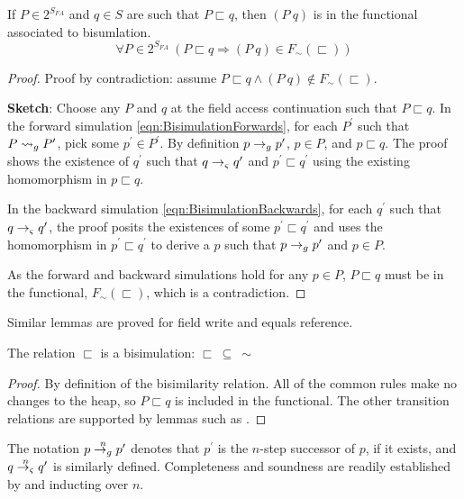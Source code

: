 \begin{lemma}
If $P \in 2^{S_\mathit{FA}}$ and $q \in S$ are such that $P \sqsubset q$, then $(P\ q)$ is in the functional associated to bisumlation.
\label{lem:access}
$$
\forall P \in 2^{S_\mathit{FA}}\ (P \sqsubset q \Rightarrow (P\ q) \in F_\sim(\sqsubset))
$$
\end{lemma}

\begin{proof}
Proof by contradiction: assume $P \sqsubset q \wedge (P\ q) \not\in F_\sim(\sqsubset)$.

\noindent\textbf{Sketch}: Choose any $P$ and $q$ at the field access continuation such
that $P \sqsubset q$. In the forward simulation
\eqref{eqn:BisimulationForwards}, for each $P^\prime$ such that $P
\leadsto_{g} P^\prime$, pick some $p^\prime \in P^\prime$. By definition $p \rightarrow_{g}
p^\prime$, $p \in P$, and $p \sqsubset q$. The proof shows the
existence of $q^\prime$ such that $q \rightarrow_{\varsigma} q^\prime$ and $p^\prime
\sqsubset q^\prime$ using the existing homomorphism in $p \sqsubset q$.

In the backward simulation \eqref{eqn:BisimulationBackwards}, for each
$q^\prime$ such that $q \rightarrow_{\varsigma} q^\prime$, the proof posits the
existences of some $p^\prime \sqsubset q^\prime$ and uses the
homomorphism in $p^\prime \sqsubset q^\prime$ to derive a $p$ such
that $p \rightarrow_{g} p^\prime$ and $p \in P$.

As the forward and backward simulations hold for any $p \in P$, $P
\sqsubset q$ must be in the functional, $F_\sim(\sqsubset)$, which is
a contradiction.
\end{proof}
Similar lemmas are proved for field write and equals reference.

\begin{theorem}
\label{th:bisim}
The relation $\sqsubset$ is a bisimulation: $\sqsubset\ \subseteq\ \sim$
\end{theorem}
\begin{proof}
By definition of the bisimilarity relation. All of the common rules
make no changes to the heap, so $P \sqsubset q$ is included in the
functional. The other transition relations are supported by lemmas
such as .
\end{proof}

The notation $p \stackrel{n}{\rightarrow_{g}} p^\prime$ denotes that $p^\prime$ is
the $n$-step successor of $p$, if it exists, and $q
\stackrel{n}{\rightarrow_{\varsigma}} q^\prime$ is similarly defined. Completeness and
soundness are readily established by  and inducting
over $n$.

